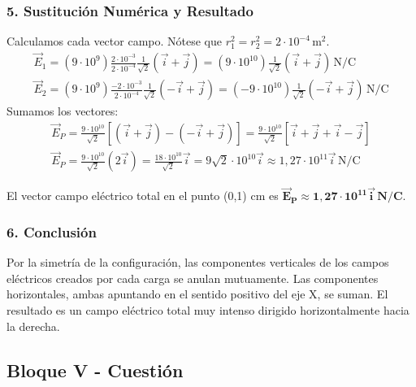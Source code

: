 \subsubsection*{5. Sustitución Numérica y Resultado}
Calculamos cada vector campo. Nótese que $r_1^2 = r_2^2 = 2 \cdot 10^{-4} \, \text{m}^2$.
\begin{gather}
    \vec{E}_1 = (9\cdot10^9) \frac{2 \cdot 10^{-3}}{2 \cdot 10^{-4}} \frac{1}{\sqrt{2}}(\vec{i} + \vec{j}) = (9 \cdot 10^{10}) \frac{1}{\sqrt{2}}(\vec{i} + \vec{j}) \, \text{N/C} \\
    \vec{E}_2 = (9\cdot10^9) \frac{-2 \cdot 10^{-3}}{2 \cdot 10^{-4}} \frac{1}{\sqrt{2}}(-\vec{i} + \vec{j}) = (-9 \cdot 10^{10}) \frac{1}{\sqrt{2}}(-\vec{i} + \vec{j}) \, \text{N/C}
\end{gather}
Sumamos los vectores:
\begin{gather}
    \vec{E}_P = \frac{9 \cdot 10^{10}}{\sqrt{2}} [(\vec{i} + \vec{j}) - (-\vec{i} + \vec{j})] = \frac{9 \cdot 10^{10}}{\sqrt{2}} [\vec{i} + \vec{j} + \vec{i} - \vec{j}] \nonumber \\
    \vec{E}_P = \frac{9 \cdot 10^{10}}{\sqrt{2}} (2\vec{i}) = \frac{18 \cdot 10^{10}}{\sqrt{2}}\vec{i} = 9\sqrt{2} \cdot 10^{10} \vec{i} \approx 1,27 \cdot 10^{11} \vec{i} \, \text{N/C}
\end{gather}
\begin{cajaresultado}
    El vector campo eléctrico total en el punto (0,1) cm es $\boldsymbol{\vec{E}_P \approx 1,27 \cdot 10^{11} \vec{i} \, \textbf{N/C}}$.
\end{cajaresultado}

\subsubsection*{6. Conclusión}
\begin{cajaconclusion}
Por la simetría de la configuración, las componentes verticales de los campos eléctricos creados por cada carga se anulan mutuamente. Las componentes horizontales, ambas apuntando en el sentido positivo del eje X, se suman. El resultado es un campo eléctrico total muy intenso dirigido horizontalmente hacia la derecha.
\end{cajaconclusion}

\newpage
\subsection{Bloque V - Cuestión}
\label{subsec:V_A_2013_jun_ord}

